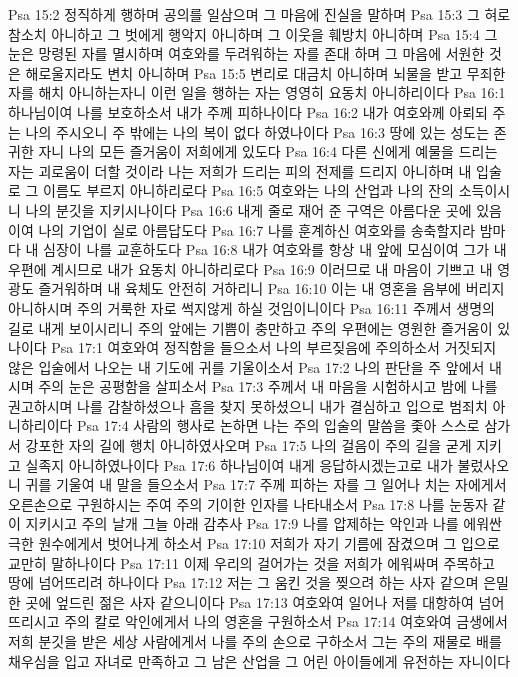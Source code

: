 Psa 15:2  정직하게 행하며 공의를 일삼으며 그 마음에 진실을 말하며
Psa 15:3  그 혀로 참소치 아니하고 그 벗에게 행악지 아니하며 그 이웃을 훼방치 아니하며
Psa 15:4  그 눈은 망령된 자를 멸시하며 여호와를 두려워하는 자를 존대 하며 그 마음에 서원한 것은 해로울지라도 변치 아니하며
Psa 15:5  변리로 대금치 아니하며 뇌물을 받고 무죄한 자를 해치 아니하는자니 이런 일을 행하는 자는 영영히 요동치 아니하리이다
Psa 16:1  하나님이여 나를 보호하소서 내가 주께 피하나이다
Psa 16:2  내가 여호와께 아뢰되 주는 나의 주시오니 주 밖에는 나의 복이 없다 하였나이다
Psa 16:3  땅에 있는 성도는 존귀한 자니 나의 모든 즐거움이 저희에게 있도다
Psa 16:4  다른 신에게 예물을 드리는 자는 괴로움이 더할 것이라 나는 저희가 드리는 피의 전제를 드리지 아니하며 내 입술로 그 이름도 부르지 아니하리로다
Psa 16:5  여호와는 나의 산업과 나의 잔의 소득이시니 나의 분깃을 지키시나이다
Psa 16:6  내게 줄로 재어 준 구역은 아름다운 곳에 있음이여 나의 기업이 실로 아름답도다
Psa 16:7  나를 훈계하신 여호와를 송축할지라 밤마다 내 심장이 나를 교훈하도다
Psa 16:8  내가 여호와를 항상 내 앞에 모심이여 그가 내 우편에 계시므로 내가 요동치 아니하리로다
Psa 16:9  이러므로 내 마음이 기쁘고 내 영광도 즐거워하며 내 육체도 안전히 거하리니
Psa 16:10  이는 내 영혼을 음부에 버리지 아니하시며 주의 거룩한 자로 썩지않게 하실 것임이니이다
Psa 16:11  주께서 생명의 길로 내게 보이시리니 주의 앞에는 기쁨이 충만하고 주의 우편에는 영원한 즐거움이 있나이다
Psa 17:1  여호와여 정직함을 들으소서 나의 부르짖음에 주의하소서 거짓되지 않은 입술에서 나오는 내 기도에 귀를 기울이소서
Psa 17:2  나의 판단을 주 앞에서 내시며 주의 눈은 공평함을 살피소서
Psa 17:3  주께서 내 마음을 시험하시고 밤에 나를 권고하시며 나를 감찰하셨으나 흠을 찾지 못하셨으니 내가 결심하고 입으로 범죄치 아니하리이다
Psa 17:4  사람의 행사로 논하면 나는 주의 입술의 말씀을 좇아 스스로 삼가서 강포한 자의 길에 행치 아니하였사오며
Psa 17:5  나의 걸음이 주의 길을 굳게 지키고 실족지 아니하였나이다
Psa 17:6  하나님이여 내게 응답하시겠는고로 내가 불렀사오니 귀를 기울여 내 말을 들으소서
Psa 17:7  주께 피하는 자를 그 일어나 치는 자에게서 오른손으로 구원하시는 주여 주의 기이한 인자를 나타내소서
Psa 17:8  나를 눈동자 같이 지키시고 주의 날개 그늘 아래 감추사
Psa 17:9  나를 압제하는 악인과 나를 에워싼 극한 원수에게서 벗어나게 하소서
Psa 17:10  저희가 자기 기름에 잠겼으며 그 입으로 교만히 말하나이다
Psa 17:11  이제 우리의 걸어가는 것을 저희가 에워싸며 주목하고 땅에 넘어뜨리려 하나이다
Psa 17:12  저는 그 움킨 것을 찢으려 하는 사자 같으며 은밀한 곳에 엎드린 젊은 사자 같으니이다
Psa 17:13  여호와여 일어나 저를 대항하여 넘어뜨리시고 주의 칼로 악인에게서 나의 영혼을 구원하소서
Psa 17:14  여호와여 금생에서 저희 분깃을 받은 세상 사람에게서 나를 주의 손으로 구하소서 그는 주의 재물로 배를 채우심을 입고 자녀로 만족하고 그 남은 산업을 그 어린 아이들에게 유전하는 자니이다
